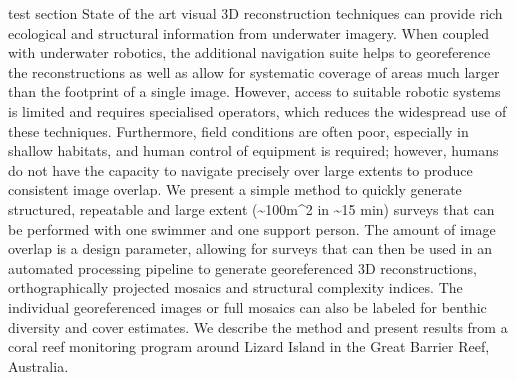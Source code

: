test section State of the art visual 3D reconstruction techniques can provide rich ecological and structural information from underwater imagery. When coupled with underwater robotics, the additional navigation suite helps to georeference the reconstructions as well as allow for systematic coverage of areas much larger than the footprint of a single image. However, access to suitable robotic systems is limited and requires specialised operators, which reduces the widespread use of these techniques. Furthermore, field conditions are often poor, especially in shallow habitats, and human control of equipment is required; however, humans do not have the capacity to navigate precisely over large extents to produce consistent image overlap. We present a simple method to quickly generate structured, repeatable and large extent (\sim{100m^{2}} in \sim{15 min}) surveys that can be performed with one swimmer and one support person. The amount of image overlap is a design parameter, allowing for surveys that can then be used in an automated processing pipeline to generate georeferenced 3D reconstructions, orthographically projected mosaics and structural complexity indices. The individual georeferenced images or full mosaics can also be labeled for benthic diversity and cover estimates. We describe the method and present results from a coral reef monitoring program around Lizard Island in the Great Barrier Reef, Australia.